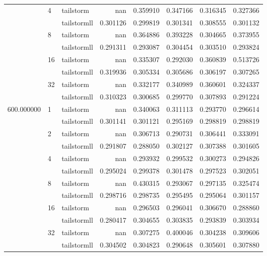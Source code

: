 \begin{tabular}{lllrrrrr}
 & \multirow[c]{2}{*}{4} & tailstorm & nan & 0.359910 & 0.347166 & 0.316345 & 0.327366 \\
 &  & tailstormll & 0.301126 & 0.299819 & 0.301341 & 0.308555 & 0.301132 \\
 & \multirow[c]{2}{*}{8} & tailstorm & nan & 0.364886 & 0.393228 & 0.304665 & 0.373955 \\
 &  & tailstormll & 0.291311 & 0.293087 & 0.304454 & 0.303510 & 0.293824 \\
 & \multirow[c]{2}{*}{16} & tailstorm & nan & 0.335307 & 0.292030 & 0.360839 & 0.513726 \\
 &  & tailstormll & 0.319936 & 0.305334 & 0.305686 & 0.306197 & 0.307265 \\
 & \multirow[c]{2}{*}{32} & tailstorm & nan & 0.332177 & 0.340989 & 0.360601 & 0.324337 \\
 &  & tailstormll & 0.310323 & 0.300685 & 0.299770 & 0.307893 & 0.291224 \\
\multirow[c]{12}{*}{600.000000} & \multirow[c]{2}{*}{1} & tailstorm & nan & 0.340063 & 0.311113 & 0.293770 & 0.296614 \\
 &  & tailstormll & 0.301141 & 0.301121 & 0.295169 & 0.298819 & 0.298819 \\
 & \multirow[c]{2}{*}{2} & tailstorm & nan & 0.306713 & 0.290731 & 0.306441 & 0.333091 \\
 &  & tailstormll & 0.291807 & 0.288050 & 0.302127 & 0.307388 & 0.301605 \\
 & \multirow[c]{2}{*}{4} & tailstorm & nan & 0.293932 & 0.299532 & 0.300273 & 0.294826 \\
 &  & tailstormll & 0.295024 & 0.299378 & 0.301478 & 0.297523 & 0.302051 \\
 & \multirow[c]{2}{*}{8} & tailstorm & nan & 0.430315 & 0.293067 & 0.297135 & 0.325474 \\
 &  & tailstormll & 0.298716 & 0.298735 & 0.295495 & 0.295064 & 0.301157 \\
 & \multirow[c]{2}{*}{16} & tailstorm & nan & 0.296503 & 0.296041 & 0.306670 & 0.288860 \\
 &  & tailstormll & 0.280417 & 0.304655 & 0.303835 & 0.293839 & 0.303934 \\
 & \multirow[c]{2}{*}{32} & tailstorm & nan & 0.307275 & 0.400046 & 0.304238 & 0.309606 \\
 &  & tailstormll & 0.304502 & 0.304823 & 0.290648 & 0.305601 & 0.307880 \\
\end{tabular}
